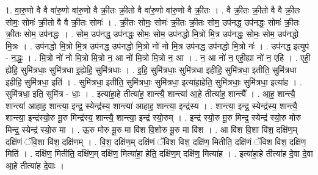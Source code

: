 \documentclass[17pt]{extarticle}
\begin{document}
1. वा॒रु॒णो वै वै वा॑रु॒णो वा॑रु॒णो वै क्री॒तः क्री॒तो वै वा॑रु॒णो वा॑रु॒णो वै क्री॒तः । . वै क्री॒तः क्री॒तो वै वै क्री॒तः सोमः॒ सोमः॑ क्री॒तो वै वै क्री॒तः सोमः॑ । . क्री॒तः सोमः॒ सोमः॑ क्री॒तः क्री॒तः सोम॒ उप॑नद्ध॒ उप॑नद्धः॒ सोमः॑ क्री॒तः क्री॒तः सोम॒ उप॑नद्धः । . सोम॒ उप॑नद्ध॒ उप॑नद्धः॒ सोमः॒ सोम॒ उप॑नद्धो मि॒त्रो मि॒त्र उप॑नद्धः॒ सोमः॒ सोम॒ उप॑नद्धो मि॒त्रः । . उप॑नद्धो मि॒त्रो मि॒त्र उप॑नद्ध॒ उप॑नद्धो मि॒त्रो नो॑ नो मि॒त्र उप॑नद्ध॒ उप॑नद्धो मि॒त्रो नः॑ । . उप॑नद्ध॒ इत्युप॑ - न॒द्धः॒ । . मि॒त्रो नो॑ नो मि॒त्रो मि॒त्रो न॒ आ नो॑ मि॒त्रो मि॒त्रो न॒ आ । . न॒ आ नो॑ न॒ एही॒ह्या नो॑ न॒ एहि॑ । . एही॒ ह्येहि॒ सुमि॑त्रधाः॒ सुमि॑त्रधा इ॒ह्येहि॒ सुमि॑त्रधाः । . इ॒हि॒ सुमि॑त्रधाः॒ सुमि॑त्रधा इहीहि॒ सुमि॑त्रधा॒ इतीति॒ सुमि॑त्रधा इहीहि॒ सुमि॑त्रधा॒ इति॑ । . सुमि॑त्रधा॒ इतीति॒ सुमि॑त्रधाः॒ सुमि॑त्रधा॒ इत्या॑हा॒हेति॒ सुमि॑त्रधाः॒ सुमि॑त्रधा॒ इत्या॑ह । . सुमि॑त्रधा॒ इति॒ सुमि॑त्र - धाः॒ । . इत्या॑हा॒हे तीत्या॑ह॒ शान्त्यै॒ शान्त्या॑ आ॒हे तीत्या॑ह॒ शान्त्यै᳚ । . आ॒ह॒ शान्त्यै॒ शान्त्या॑ आहाह॒ शान्त्या॒ इन्द्र॒ स्येन्द्र॑स्य॒ शान्त्या॑ आहाह॒ शान्त्या॒ इन्द्र॑स्य । . शान्त्या॒ इन्द्र॒ स्येन्द्र॑स्य॒ शान्त्यै॒ शान्त्या॒ इन्द्र॑स्यो॒रु मू॒रु मिन्द्र॑स्य॒ शान्त्यै॒ शान्त्या॒ इन्द्र॑ स्यो॒रुम् । . इन्द्र॑ स्यो॒रु मू॒रु मिन्द्र॒ स्येन्द्र॑ स्यो॒रु मोरु मिन्द्र॒ स्येन्द्र॑ स्यो॒रु मा । . ऊ॒रु मोरु मू॒रु मा वि॑श वि॒शोरु मू॒रु मा वि॑श । . आ वि॑श वि॒शा वि॑श॒ दक्षि॑ण॒म् दक्षि॑णं ॅवि॒शा वि॑श॒ दक्षि॑णम् । . वि॒श॒ दक्षि॑ण॒म् दक्षि॑णं ॅविश विश॒ दक्षि॑ण॒ मितीति॒ दक्षि॑णं ॅविश विश॒ दक्षि॑ण॒ मिति॑ । . दक्षि॑ण॒ मितीति॒ दक्षि॑ण॒म् दक्षि॑ण॒ मित्या॑हा॒ हेति॒ दक्षि॑ण॒म् दक्षि॑ण॒ मित्या॑ह । . इत्या॑हा॒हे तीत्या॑ह दे॒वा दे॒वा आ॒हे तीत्या॑ह दे॒वाः । \newline
\end{document}
